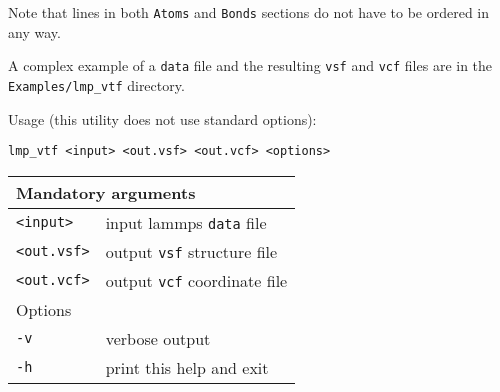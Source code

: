 Note that lines in both \texttt{Atoms} and \texttt{Bonds} sections do not
have to be ordered in any way.

A complex example of a \texttt{data} file and the resulting \texttt{vsf}
and \texttt{vcf} files are in the \texttt{Examples/lmp\_vtf} directory.

Usage (this utility does not use standard options):

\vspace{1em}
\noindent
\texttt{lmp\_vtf <input> <out.vsf> <out.vcf> <options>}

\noindent
\begin{longtable}{p{}p{}}
  \toprule
  \multicolumn{2}{l}{Mandatory arguments} \\
  \midrule
  \texttt{<input>} & input lammps \texttt{data} file \\
  \texttt{<out.vsf>} & output \texttt{vsf} structure file \\
  \texttt{<out.vcf>} & output \texttt{vcf} coordinate file \\
  \toprule
  \multicolumn{2}{l}{Options}\\
  \midrule
  \texttt{-v} & verbose output\\
  \texttt{-h} & print this help and exit\\
  \bottomrule
\end{longtable}
